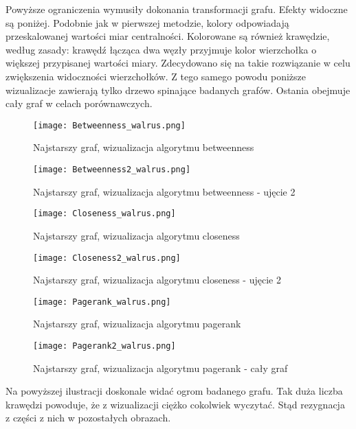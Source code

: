Powyższe ograniczenia wymusiły dokonania transformacji grafu. Efekty widoczne są poniżej. Podobnie jak w pierwszej metodzie, kolory odpowiadają przeskalowanej wartości miar centralności. Kolorowane są również krawędzie, według zasady: krawędź łącząca dwa węzły przyjmuje kolor wierzchołka o większej przypisanej wartości miary. Zdecydowano się na takie rozwiązanie w celu zwiększenia widoczności wierzchołków. Z tego samego powodu poniższe wizualizacje zawierają tylko drzewo spinające badanych grafów. Ostania obejmuje cały graf w celach porównawczych. 

\FloatBarrier\FloatBarrier
\begin{figure}[h]
	\centering
	\texttt{[image: Betweenness\_walrus.png]}
	\caption{Najstarszy graf, wizualizacja algorytmu betweenness}
\end{figure}
\FloatBarrier\FloatBarrier
\FloatBarrier\FloatBarrier
\begin{figure}[h]
	\centering
	\texttt{[image: Betweenness2\_walrus.png]}
	\caption{Najstarszy graf, wizualizacja algorytmu betweenness - ujęcie 2}
\end{figure}
\FloatBarrier\FloatBarrier

\FloatBarrier\FloatBarrier
\begin{figure}[h]
	\centering
	\texttt{[image: Closeness\_walrus.png]}
	\caption{Najstarszy graf, wizualizacja algorytmu closeness}
\end{figure}
\FloatBarrier\FloatBarrier
\FloatBarrier\FloatBarrier
\begin{figure}[h]
	\centering
	\texttt{[image: Closeness2\_walrus.png]}
	\caption{Najstarszy graf, wizualizacja algorytmu closeness - ujęcie 2}
\end{figure}
\FloatBarrier\FloatBarrier        
\FloatBarrier\FloatBarrier
\begin{figure}[h]
	\centering
	\texttt{[image: Pagerank\_walrus.png]}
	\caption{Najstarszy graf, wizualizacja algorytmu pagerank}
\end{figure}
\FloatBarrier\FloatBarrier
\FloatBarrier\FloatBarrier
\begin{figure}[h]
	\centering
	\texttt{[image: Pagerank2\_walrus.png]}
	\caption{Najstarszy graf, wizualizacja algorytmu pagerank - cały graf}
\end{figure}
  

Na powyższej ilustracji doskonale widać ogrom badanego grafu. Tak duża liczba krawędzi powoduje, że z wizualizacji ciężko cokolwiek wyczytać. Stąd rezygnacja z części z nich w pozostałych obrazach.